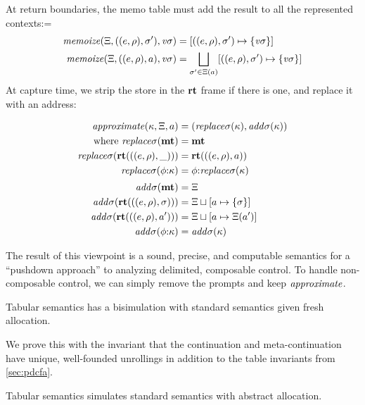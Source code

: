 At return boundaries, the memo table must add the result to all the represented contexts:=
\begin{align*}
  \mathit{memoize}(\Xi, ((e,\rho), \sigma'), \mathit{v\sigma}) &=
  [((e,\rho), \sigma') \mapsto \{ {\mathit{v\sigma}} \}] \\
  \mathit{memoize}(\Xi, ((e,\rho), a), \mathit{v\sigma}) &=
  \bigsqcup\limits_{\sigma' \in \Xi(a)}[((e,\rho), \sigma') \mapsto \{ \mathit{v\sigma} \}]
\end{align*}
At capture time, we strip the store in the $\mathbf{rt}$ frame if there is one, and replace it with an address:

\newcommand{\replacectx}{\mathit{replace}\mstore}
\newcommand{\addstore}{\mathit{add}\mstore}
\begin{align*}
  \approximate(\mkont, \mktab, \maddr) &= (\replacectx(\mkont), \addstore(\mkont)) \\
  \text{where }
   \replacectx(\kmt) &= \kmt \\
   \replacectx(\krt{((\mexpr,\menv),\_)}) &= \krt{((\mexpr,\menv),\maddr)} \\
   \replacectx(\kcons{\mkframe}{\mkont}) &= \kcons{\mkframe}{\replacectx(\mkont)}
  \\[2pt]
   \addstore(\kmt) &= \mktab \\
   \addstore(\krt{((\mexpr,\menv),\mstore)}) &= \joinone{\mktab}{\maddr}{\mstore} \\
   \addstore(\krt{((\mexpr,\menv),\maddr')}) &= \joinm{\mktab}{\maddr}{\mktab(\maddr')} \\
   \addstore(\kcons{\mkframe}{\mkont}) &= \addstore(\mkont)
\end{align*}

The result of this viewpoint is a sound, precise, and computable semantics for a ``pushdown approach'' to analyzing delimited, composable control.
%
To handle non-composable control, we can simply remove the prompts and keep $\mathit{approximate}$.

\begin{conjecture}\label{thm:concrete-sr}
  Tabular semantics has a bisimulation with standard semantics given fresh allocation.
\end{conjecture}

We prove this with the invariant that the continuation and meta-continuation have unique, well-founded unrollings in addition to the table invariants from \autoref{sec:pdcfa}.

\begin{conjecture}\label{thm:sound-sr}
  Tabular semantics simulates standard semantics with abstract allocation.
\end{conjecture}

